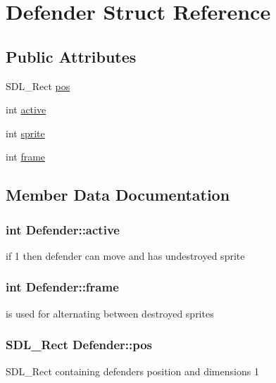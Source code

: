 \hypertarget{structDefender}{}\section{Defender Struct Reference}
\label{structDefender}
\subsection*{Public Attributes}
\begin{DoxyCompactItemize}
\item 
S\+D\+L\+\_\+\+Rect \hyperlink{structDefender_a27b605031a82285c0c975ad025a27b90}{pos}
\item 
int \hyperlink{structDefender_abc65e620f0eed095db1e083ebe43f84c}{active}
\item 
int \hyperlink{structDefender_a029bf2149c57ff793a93fa5b49bb9d18}{sprite}
\item 
int \hyperlink{structDefender_a1bf62c7eb1c3a839f58729011a03ac6d}{frame}
\end{DoxyCompactItemize}


\subsection{Member Data Documentation}
\hypertarget{structDefender_abc65e620f0eed095db1e083ebe43f84c}{}
\subsubsection[{active}]{\setlength{\rightskip}{0pt plus 5cm}int Defender\+::active}\label{structDefender_abc65e620f0eed095db1e083ebe43f84c}
if 1 then defender can move and has undestroyed sprite \hypertarget{structDefender_a1bf62c7eb1c3a839f58729011a03ac6d}{}
\subsubsection[{frame}]{\setlength{\rightskip}{0pt plus 5cm}int Defender\+::frame}\label{structDefender_a1bf62c7eb1c3a839f58729011a03ac6d}
is used for alternating between destroyed sprites \hypertarget{structDefender_a27b605031a82285c0c975ad025a27b90}{}
\subsubsection[{pos}]{\setlength{\rightskip}{0pt plus 5cm}S\+D\+L\+\_\+\+Rect Defender\+::pos}\label{structDefender_a27b605031a82285c0c975ad025a27b90}
S\+D\+L\+\_\+\+Rect containing defender\textquotesingle{}s position and dimensions 1 \hypertarget{structDefender_a029bf2149c57ff793a93fa5b49bb9d18}{}
